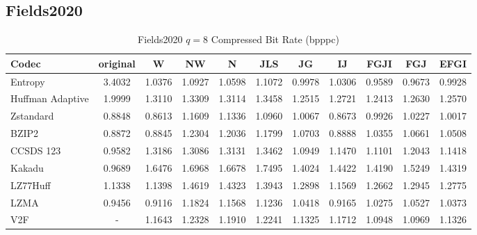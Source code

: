 \documentclass{article}
\begin{document}
\subsection{Fields2020}
\begin{table}[h!]
\centering
\caption{Fields2020 $q=8$ Compressed Bit Rate (bpppc)}
\begin{tabular}{|l|cccccccccc|}
\hline
Codec &  original &      W &     NW &      N &    JLS &     JG &     IJ &   FGJI &    FGJ &   EFGI \\
\hline
Entropy & 3.4032 & 1.0376 & 1.0927 & 1.0598 & 1.1072 & 0.9978 & 1.0306 & 0.9589 & 0.9673 & 0.9928 \\
\hline
Huffman Adaptive &    1.9999 & 1.3110 & 1.3309 & 1.3114 & 1.3458 & 1.2515 & 1.2721 & 1.2413 & 1.2630 & 1.2570 \\
Zstandard        &    0.8848 & 0.8613 & 1.1609 & 1.1336 & 1.0960 & 1.0067 & 0.8673 & 0.9926 & 1.0227 & 1.0017 \\
BZIP2            &    0.8872 & 0.8845 & 1.2304 & 1.2036 & 1.1799 & 1.0703 & 0.8888 & 1.0355 & 1.0661 & 1.0508 \\
CCSDS 123        &    0.9582 & 1.3186 & 1.3086 & 1.3131 & 1.3462 & 1.0949 & 1.1470 & 1.1101 & 1.2043 & 1.1418 \\
Kakadu           &    0.9689 & 1.6476 & 1.6968 & 1.6678 & 1.7495 & 1.4024 & 1.4422 & 1.4190 & 1.5249 & 1.4319 \\
LZ77Huff         &    1.1338 & 1.1398 & 1.4619 & 1.4323 & 1.3943 & 1.2898 & 1.1569 & 1.2662 & 1.2945 & 1.2775 \\
LZMA             &    0.9456 & 0.9116 & 1.1824 & 1.1568 & 1.1236 & 1.0418 & 0.9165 & 1.0275 & 1.0527 & 1.0373 \\
V2F              &   - & 1.1643 & 1.2328 & 1.1910 & 1.2241 & 1.1325 & 1.1712 & 1.0948 & 1.0969 & 1.1326 \\
\hline
\end{tabular}
\end{table}
\end{document}
